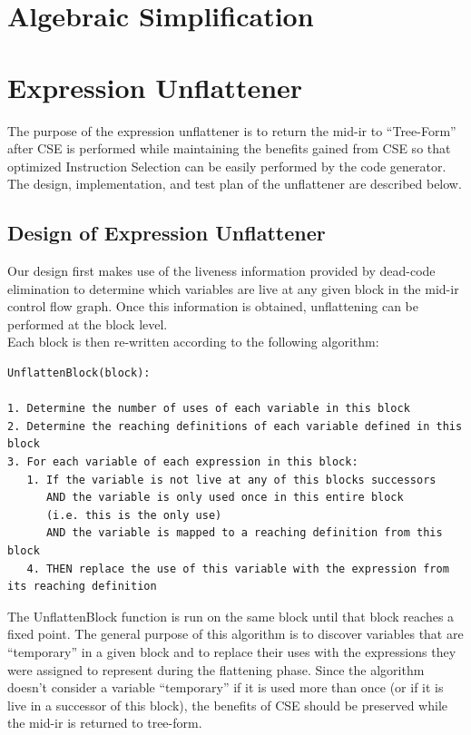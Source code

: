 \documentclass[11pt]{article}
\begin{document}
\section {Algebraic Simplification} 


\section {Expression Unflattener}

The purpose of the expression unflattener is to return the mid-ir to
``Tree-Form'' after CSE is performed while maintaining the benefits
gained from CSE so that optimized Instruction Selection can be easily
performed by the code generator. The design, implementation, and test
plan of the unflattener are described below.

\subsection{Design of Expression Unflattener}

Our design first makes use of the liveness information
provided by dead-code elimination to determine which variables are
live at any given block in the mid-ir control flow graph. Once this
information is obtained, unflattening can be performed at the block
level.\\


\noindent Each block is then re-written according to the following algorithm: 

\begin{verbatim}
UnflattenBlock(block):

1. Determine the number of uses of each variable in this block 
2. Determine the reaching definitions of each variable defined in this
block
3. For each variable of each expression in this block: 
   1. If the variable is not live at any of this blocks successors 
      AND the variable is only used once in this entire block 
      (i.e. this is the only use)
      AND the variable is mapped to a reaching definition from this block 
   4. THEN replace the use of this variable with the expression from
its reaching definition
\end{verbatim}

\noindent The UnflattenBlock function is run on the same block until that block
reaches a fixed point. The general purpose of this algorithm is to
discover variables that are ``temporary'' in a given block and to replace
their uses with the expressions they were assigned to represent during
the flattening phase. Since the algorithm doesn't consider a variable
``temporary'' if it is used more than once (or if it is live in a
successor of this block), the benefits of CSE should be preserved
while the mid-ir is returned to tree-form. 
\end{document}
